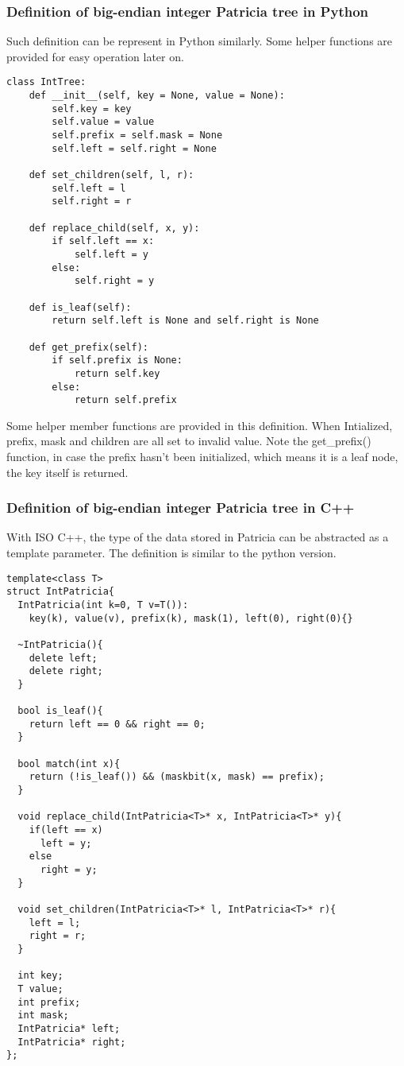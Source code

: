 \documentclass{article}
\begin{document}
\subsubsection*{Definition of big-endian integer Patricia tree in Python}
Such definition can be represent in Python similarly. Some helper
functions are provided for easy operation later on.

\lstset{language=Python}
\begin{lstlisting}
class IntTree:
    def __init__(self, key = None, value = None):
        self.key = key
        self.value = value
        self.prefix = self.mask = None
        self.left = self.right = None

    def set_children(self, l, r):
        self.left = l
        self.right = r

    def replace_child(self, x, y):
        if self.left == x:
            self.left = y
        else:
            self.right = y

    def is_leaf(self):
        return self.left is None and self.right is None

    def get_prefix(self):
        if self.prefix is None:
            return self.key
        else:
            return self.prefix
\end{lstlisting}

Some helper member functions are provided in this definition. When
Intialized, prefix, mask and children are all set to invalid value.
Note the get\_prefix() function, in case the prefix hasn't been
initialized, which means it is a leaf node, the key itself is returned.

\subsubsection*{Definition of big-endian integer Patricia tree in C++}

With ISO C++, the type of the data stored in Patricia can be abstracted
as a template parameter. The definition is similar to the python version.

\lstset{language=C++}
\begin{lstlisting}
template<class T>
struct IntPatricia{
  IntPatricia(int k=0, T v=T()): 
    key(k), value(v), prefix(k), mask(1), left(0), right(0){}

  ~IntPatricia(){
    delete left;
    delete right;
  }

  bool is_leaf(){
    return left == 0 && right == 0;
  }

  bool match(int x){
    return (!is_leaf()) && (maskbit(x, mask) == prefix);
  }

  void replace_child(IntPatricia<T>* x, IntPatricia<T>* y){
    if(left == x)
      left = y;
    else
      right = y;
  }

  void set_children(IntPatricia<T>* l, IntPatricia<T>* r){
    left = l;
    right = r;
  }

  int key;
  T value;
  int prefix;
  int mask;
  IntPatricia* left;
  IntPatricia* right;
};
\end{lstlisting}
\end{document}
